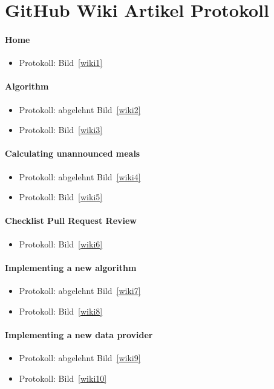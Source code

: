 \documentclass[accentcolor=tud0b,12pt,paper=a4]{tudreport}
\begin{document}
\section{GitHub Wiki Artikel Protokoll}

\paragraph{Home}
\begin{itemize}
\item Protokoll: Bild~\ref{wiki1}
\end{itemize}

\paragraph{Algorithm}
\begin{itemize}
\item Protokoll: abgelehnt Bild~\ref{wiki2}
\item Protokoll: Bild~\ref{wiki3}
\end{itemize}

\paragraph{Calculating unannounced meals}
\begin{itemize}
\item Protokoll: abgelehnt Bild~\ref{wiki4}
\item Protokoll: Bild~\ref{wiki5}
\end{itemize}

\paragraph{Checklist Pull Request Review}
\begin{itemize}
\item Protokoll: Bild~\ref{wiki6}
\end{itemize}

\paragraph{Implementing a new algorithm}
\begin{itemize}
\item Protokoll: abgelehnt Bild~\ref{wiki7}
\item Protokoll: Bild~\ref{wiki8}
\end{itemize}

\paragraph{Implementing a new data provider}
\begin{itemize}
\item Protokoll: abgelehnt Bild~\ref{wiki9}
\item Protokoll: Bild~\ref{wiki10}
\end{itemize}
\end{document}
